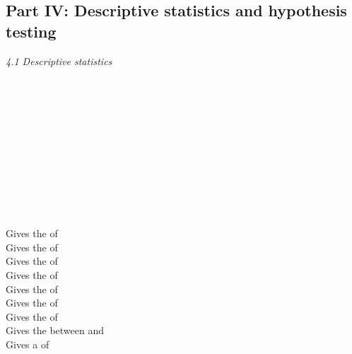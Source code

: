 \label{rhelppartfour}

\subsection{Part IV: Descriptive statistics and hypothesis testing}

\textit{4.1 Descriptive statistics} \\
\\
\begin{minipage}[t]{.4\textwidth}
\vspace*{-8pt}
 \\ 
 \\
 \\
 \\ 
 \\	
 \\
 \\
 \\
 \\
\end{minipage}
\begin{minipage}[t]{.6\textwidth}
Gives the  of  \\
Gives the  of  \\
Gives the  of  \\
Gives the  of  \\
Gives the  of  \\
Gives the  of  \\
Gives the  of  \\
Gives the  between  and  \\
Gives a  of   \\
\end{minipage}
\vspace*{.5cm}

